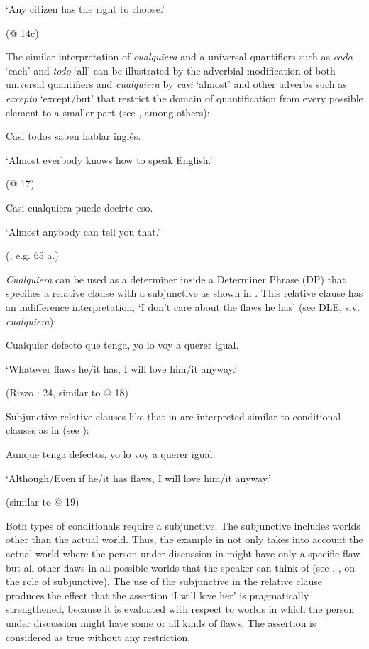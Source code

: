   ‘Any citizen has the right to choose.’

  (@ 14c)

The similar interpretation of \textit{cualquiera} and a universal quantifiers such as \textit{cada} ‘each’ and \textit{todo} ‘all’ can be illustrated by the adverbial modification of both universal quantifiers and \textit{cualquiera} by \textit{casi} ‘almost’ and other adverbs such as \textit{excepto} ‘except/but’ that restrict the domain of quantification from every possible element to a smaller part (see \citealt{Arregui2006}, among others):

  Casi todos saben hablar inglés. 

  ‘Almost everbody knows how to speak English.’

  (@ 17)

  Casi cualquiera puede decirte eso.

  ‘Almost anybody can tell you that.’

  (\citealt{Arregui2006}, e.g. 65 a.)

\textit{Cualquiera} can be used as a determiner inside a Determiner Phrase (DP) that specifies a relative clause with a subjunctive as shown in . This relative clause has an indifference interpretation, ‘I don’t care about the flaws he has’ (see DLE, s.v. \textit{cualquiera}):

\label{bkm:Ref512708}  Cualquier defecto que tenga, yo lo voy a querer igual.

  ‘Whatever flaws he/it has, I will love him/it anyway.’

  (Rizzo \citealt{Salierno2013}: 24, similar to @ 18)

Subjunctive relative clauses like that in  are interpreted similar to conditional clauses as in  (see \citealt{Quer2000}):

\label{bkm:Ref513122}  Aunque tenga defectos, yo lo voy a querer igual.

  ‘Although/Even if he/it has flaws, I will love him/it anyway.’

  (similar to @ 19)

Both types of conditionals require a subjunctive. The subjunctive includes worlds other than the actual world. Thus, the example in  not only takes into account the actual world where the person under discussion in might have only a specific flaw but all other flaws in all possible worlds that the speaker can think of (see \citealt{Quer2000}, \citealt{Chierchia2006}, \citealt{Becker2014} on the role of subjunctive). The use of the subjunctive in the relative clause produces the effect that the assertion ‘I will love her’ is pragmatically strengthened, because it is evaluated with respect to worlds in which the person under discussion might have some or all kinds of flaws. The assertion is considered as true without any restriction. 

